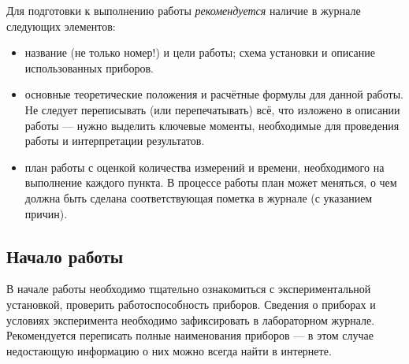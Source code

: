 Для подготовки к выполнению работы \emph{рекомендуется} наличие в журнале следующих
элементов:
\begin{itemize}
    \small
    \item название (не только номер!) и цели работы; схема установки и описание использованных приборов.


    \item основные теоретические положения и расчётные формулы для данной работы.
    Не следует переписывать (или перепечатывать) всё, что изложено в описании
    работы --- нужно выделить ключевые моменты, необходимые для
    проведения работы и интерпретации результатов.

    \item план работы с оценкой количества измерений и времени, необходимого на
выполнение каждого пункта.
В процессе работы план может меняться, о чем должна
быть сделана соответствующая пометка в журнале (с указанием причин).
\end{itemize}


\subsection{Начало работы}

В начале работы необходимо тщательно ознакомиться с экспериментальной
установкой, проверить работоспособность приборов. Сведения о приборах
и условиях эксперимента необходимо
зафиксировать в лабораторном журнале. Рекомендуется переписать полные наименования
приборов --- в этом случае недостающую информацию о них можно всегда найти в интернете.





